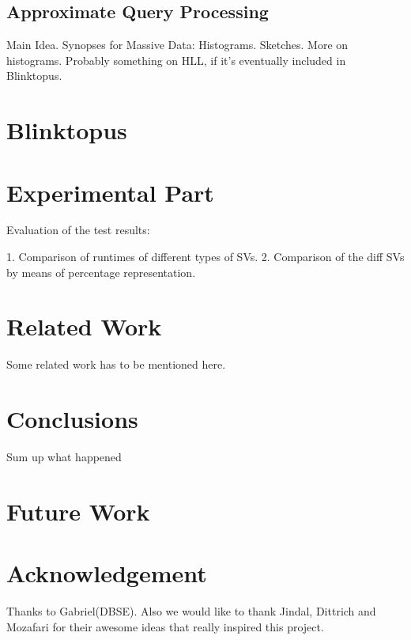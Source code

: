 \documentclass[10pt, conference, compsocconf]{IEEEtran}
\begin{document}
\subsection{Approximate Query Processing}
Main Idea. Synopses for Massive Data: Histograms. Sketches.
More on histograms. 
Probably something on HLL, if it's eventually included in Blinktopus.

\section{Blinktopus}

\section{Experimental Part}
Evaluation of the test results:
 
1. Comparison of runtimes of different types of SVs.
2. Comparison of the diff SVs by means of percentage representation.

\section{Related Work}
Some related work has to be mentioned here.

\section{Conclusions}
Sum up what happened

\section{Future Work}


\section*{Acknowledgement}
Thanks to Gabriel(DBSE). Also we would like to thank Jindal, Dittrich and Mozafari for their awesome ideas that really inspired this project.
\end{document}
